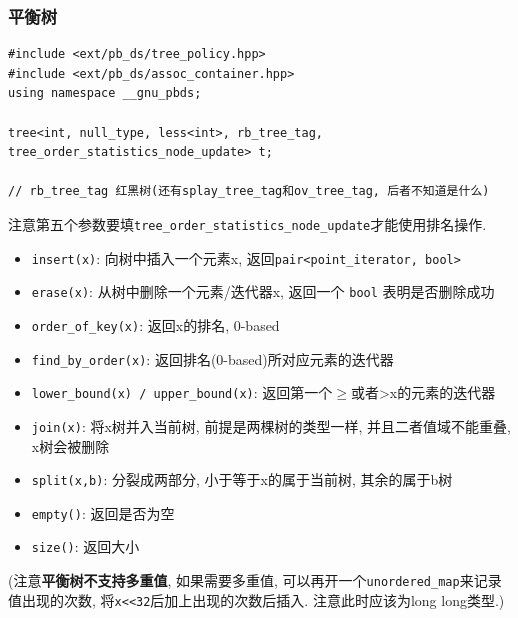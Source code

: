 \subsubsection{平衡树}

\begin{verbatim}
#include <ext/pb_ds/tree_policy.hpp>
#include <ext/pb_ds/assoc_container.hpp>
using namespace __gnu_pbds;

tree<int, null_type, less<int>, rb_tree_tag, tree_order_statistics_node_update> t;

// rb_tree_tag 红黑树(还有splay_tree_tag和ov_tree_tag, 后者不知道是什么)
\end{verbatim}

注意第五个参数要填\texttt{tree_order_statistics_node_update}才能使用排名操作.

\begin{itemize}
	\item \texttt{insert(x)}: 向树中插入一个元素x, 返回\texttt{pair<point_iterator, bool>}
	\item \texttt{erase(x)}: 从树中删除一个元素/迭代器x, 返回一个 \texttt{bool} 表明是否删除成功
	\item \texttt{order_of_key(x)}: 返回x的排名, 0-based
	\item \texttt{find_by_order(x)}: 返回排名(0-based)所对应元素的迭代器
	\item \texttt{lower_bound(x) / upper_bound(x)}: 返回第一个$\ge$或者>x的元素的迭代器
	\item \texttt{join(x)}: 将x树并入当前树, 前提是两棵树的类型一样, 并且二者值域不能重叠, x树会被删除
	\item \texttt{split(x,b)}: 分裂成两部分, 小于等于x的属于当前树, 其余的属于b树
	\item \texttt{empty()}: 返回是否为空
	\item \texttt{size()}: 返回大小
\end{itemize}

(注意\textbf{平衡树不支持多重值}, 如果需要多重值, 可以再开一个\texttt{unordered_map}来记录值出现的次数, 将\texttt{x<<32}后加上出现的次数后插入. 注意此时应该为long long类型.)